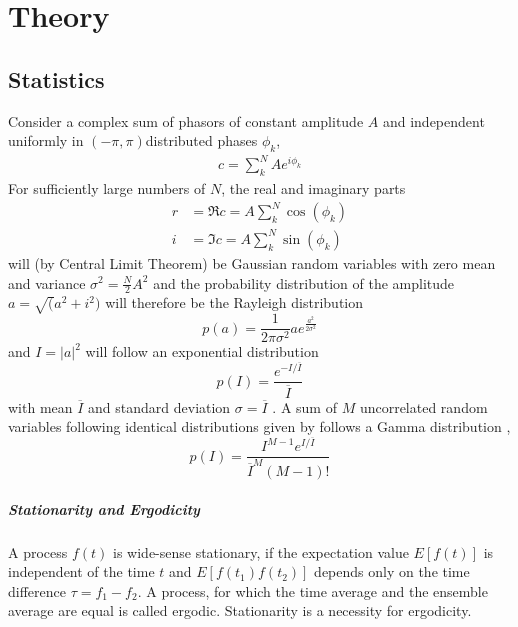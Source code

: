 \chapter{Theory}

\cite{goodman2000,goodman2007,agarwal2013,classen2017,cowley1995,born1980,trigg2005,attwood1999,griffiths2005,agarwal2013,classen2017,loudon2000,mandel1995,hanburry1956,galuber2006,baym1997,zernike1938,rosen96,yabashi2002,singer2013,santra2009,krause1979,trost2020,inoue2019,sorum1987,lajunen04,mpccd,tono2013}


\section{Statistics}
Consider a complex sum of phasors of constant amplitude $A$ and independent uniformly in $(-\pi,\pi)$distributed phases $\phi_k$,
\begin{align}
c=\sum^N_k A e^{i\phi_k}
\end{align}
For sufficiently large numbers of $N$, the real and imaginary parts
\begin{align*}
r&=\Re c =  A \sum^N_k \cos(\phi_k)\\
i&= \Im c =A \sum^N_k \sin(\phi_k)
\end{align*}
will (by Central Limit Theorem) be Gaussian random variables with zero mean and variance $\sigma^2=\frac{N}{2}A^2$ and the probability distribution of the amplitude $a=\sqrt(a^2+i^2)$ will  therefore be the Rayleigh distribution
\begin{equation}
	p(a)=\frac{1}{2\pi\sigma^2} a e^{\frac{a^2}{2\sigma^2}}
\end{equation}
and  $I=\left|a\right|^2$ will  follow an exponential distribution
\begin{equation}
	\label{eq:expdistr}
	p(I)=\frac{ e^{-I/\overline{I}}}{\overline{I}}
\end{equation} 
with mean $\overline{I}$ and standard deviation $\sigma=\overline{I}$  \cite{goodman2000,goodman1976}.
A sum of $M$ uncorrelated random variables following identical distributions given by  follows a Gamma distribution \cite{forbes2010,trost2020},
\begin{equation}
p(I)=\frac{I^{M-1} e^{I/\overline{I}}} {\overline{I}^M(M-1)!}
\end{equation}
\paragraph{Stationarity and Ergodicity}
A process $f(t)$ is wide-sense stationary, if the expectation value $E[f(t)]$ is independent of the time $t$ and $E[f(t_1)f(t_2)]$ depends only on the time difference $\tau=f_1-f_2$. A process, for which the time average and the ensemble average are equal is called ergodic. Stationarity is a necessity for ergodicity.

